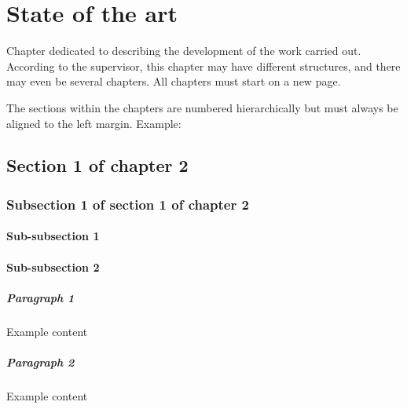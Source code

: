 \chapter{State of the art}

Chapter dedicated to describing the development of the work carried out. According to the supervisor, this chapter may have different structures, and there may even be several chapters.
All chapters must start on a new page.

The sections within the chapters are numbered hierarchically but must always be aligned to the left margin. Example:

\section{Section 1 of chapter 2}

\subsection{Subsection 1 of section 1 of chapter 2}

\subsubsection{Sub-subsection 1}

\subsubsection{Sub-subsection 2}

\paragraph{Paragraph 1} Example content

\paragraph{Paragraph 2} Example content
